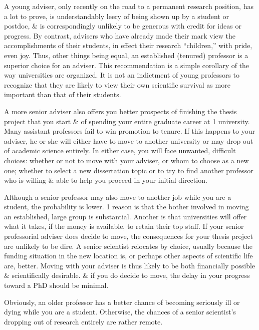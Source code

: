 \documentclass{article}
\begin{document}
\begin{enumerate}
\begin{itemize}
\begin{itemize}
			A young adviser, only recently on the road to a permanent research position, has a lot to prove, is understandably leery of being shown up by a student or postdoc, \& is correspondingly unlikely to be generous with credit for ideas or progress. By contrast, advisers who have already made their mark view the accomplishments of their students, in effect their research ``children,'' with pride, even joy. Thus, other things being equal, an established (tenured) professor is a superior choice for an adviser. This recommendation is a simple corollary of the way universities are organized. It is not an indictment of young professors to recognize that they are likely to view their own scientific survival as more important than that of their students.
			
			A more senior adviser also offers you better prospects of finishing the thesis project that you start \& of spending your entire graduate career at 1 university. Many assistant professors fail to win promotion to tenure. If this happens to your adviser, he or she will either have to move to another university or may drop out of academic science entirely. In either case, you will face unwanted, difficult choices: whether or not to move with your adviser, or whom to choose as a new one; whether to select a new dissertation topic or to try to find another professor who is willing \& able to help you proceed in your initial direction.
			
			Although a senior professor may also move to another job while you are a student, the probability is lower. 1 reason is that the bother involved in moving an established, large group is substantial. Another is that universities will offer what it takes, if the money is available, to retain their top staff. If your senior professorial adviser does decide to move, the consequences for your thesis project are unlikely to be dire. A senior scientist relocates by choice, usually because the funding situation in the new location is, or perhaps other aspects of scientific life are, better. Moving with your adviser is thus likely to be both financially possible \& scientifically desirable. \& if you do decide to move, the delay in your progress toward a PhD should be minimal.
			
			Obviously, an older professor has a better chance of becoming seriously ill or dying while you are a student. Otherwise, the chances of a senior scientist's dropping out of research entirely are rather remote.
			

\end{itemize}
\end{itemize}
\end{enumerate}
\end{document}
